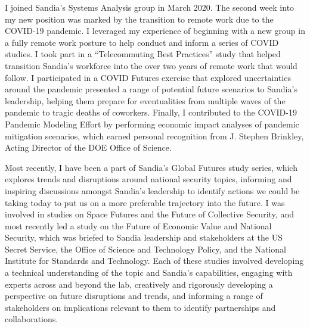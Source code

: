 \documentclass[11pt]{article}
\begin{document}
I joined Sandia's Systems Analysis group in March 2020. The second week into my new position was marked by the transition to remote work due to the COVID-19 pandemic. I leveraged my experience of beginning with a new group in a fully remote work posture to help conduct and inform a series of COVID studies. I took part in a ``Telecommuting Best Practices'' study that helped transition Sandia's workforce into the over two years of remote work that would follow. I participated in a COVID Futures exercise that explored uncertainties around the pandemic presented a range of potential future scenarios to Sandia's leadership, helping them prepare for eventualities from multiple waves of the pandemic to tragic deaths of coworkers. Finally, I contributed to the COVID-19 Pandemic Modeling Effort by performing economic impact analyses of pandemic mitigation scenarios, which earned personal recognition from J. Stephen Brinkley, Acting Director of the DOE Office of Science.

Most recently, I have been a part of Sandia's Global Futures study series, which explores trends and disruptions around national security topics, informing and inspiring discussions amongst Sandia's leadership to identify actions we could be taking today to put us on a more preferable trajectory into the future. I was involved in studies on Space Futures and the Future of Collective Security, and most recently led a study on the Future of Economic Value and National Security, which was briefed to Sandia leadership and stakeholders at the US Secret Service, the Office of Science and Technology Policy, and the National Institute for Standards and Technology. Each of these studies involved developing a technical understanding of the topic and Sandia's capabilities, engaging with experts across and beyond the lab, creatively and rigorously developing a perspective on future disruptions and trends, and informing a range of stakeholders on implications relevant to them to identify partnerships and collaborations.
\end{document}
